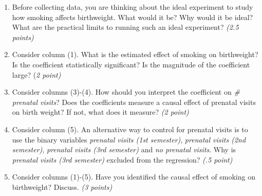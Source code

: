 \documentclass{article}
\begin{document}
\begin{enumerate}[label=\alph*)]
\item Before collecting data, you are thinking about the ideal experiment to study how smoking affects birthweight. What would it be? Why would it be ideal? What are the practical limits to running such an ideal experiment? \textit{(2.5 points)}
\item Consider column (1). What is the estimated effect of smoking on birthweight? Is the coefficient statistically significant? Is the magnitude of the coefficient large? (\textit{2 point)}
\item  Consider columns (3)-(4). How should you interpret the coefficient on \textit{\# prenatal visits}? Does the coefficients measure a causal effect of prenatal visits on birth weight? If not, what does it measure? \textit{(2 point)}
\item Consider column (5). An alternative way to control for prenatal visits is to use the binary variables \textit{prenatal visits (1st semester)},  \textit{prenatal visits (2nd semester)},  \textit{prenatal visits (3rd semester)} and \textit{no prenatal visits}. Why is \textit{prenatal visits (3rd semester)} excluded from the regression? \textit{(.5 point)}
\item Consider columns (1)-(5). Have you identified the causal effect of smoking on birthweight? Discuss. \textit{(3 points)}
\end{enumerate}

\newpage
\end{document}
